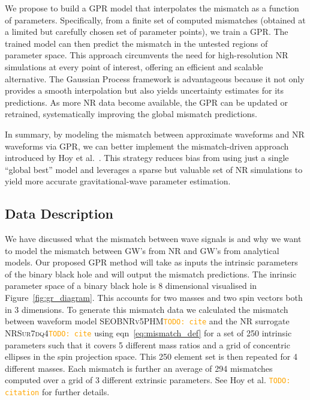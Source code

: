 \documentclass[12pt]{article}
\newcommand{\todo}[1]{\textcolor{orange}{\texttt{TODO: #1}}}
\begin{document}
We propose to build a GPR model that interpolates the mismatch as a function of parameters. Specifically, from a finite set of computed mismatches (obtained at a limited but carefully chosen set of parameter points), we train a GPR. The trained model can then predict the mismatch in the untested regions of parameter space. This approach circumvents the need for high-resolution NR simulations at every point of interest,
offering an efficient and scalable alternative. The Gaussian Process framework is advantageous because it not only provides a smooth interpolation but also yields uncertainty estimates for its predictions.
 As more NR data become available, the GPR can be updated or retrained, systematically improving the global mismatch predictions.

 In summary, by modeling the mismatch between approximate waveforms and NR waveforms via GPR, we can better implement the mismatch-driven approach introduced by Hoy et al.~\cite{Ogpaper}. This strategy reduces bias from using just a single “global best” model and leverages a sparse but valuable set of NR simulations to yield more accurate gravitational-wave parameter estimation.

\subsection{Data Description}
\label{sec:data_description}
We have discussed what the mismatch between wave signals is and why we want to model the mismatch between GW's from NR and GW's from analytical models.
Our proposed GPR method will take as inputs the intrinsic parameters of the binary black hole and will output the mismatch predictions.
The inrinsic parameter space of a binary black hole is 8 dimensional visualised in Figure~\ref{fig:gr_diagram}. This accounts for two masses and two spin vectors both in 3 dimensions. 
To generate this mismatch data we calculated the mismatch between waveform model \textsc{SEOBNRv5PHM}\todo{cite} and the NR surrogate \textsc{NRSur7dq4}\todo{cite} using eqn~\eqref{eq:mismatch_def} for a set of 250 intrinsic parameters 
such that it covers 5 different mass ratios and a grid of concentric ellipses in the spin projection space.
This 250 element set is then repeated for 4 different masses.
Each mismatch is further an average of 294 mismatches computed over a grid of 3 different extrinsic parameters.
See Hoy et al. \todo{citation} for further details.
%
\end{document}
